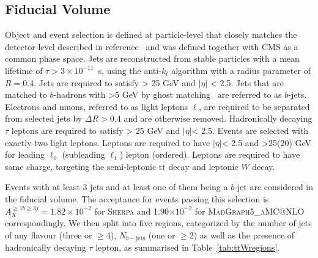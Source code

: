 
\subsection{Fiducial Volume}
\label{sec:ttw_fid}
Object and event selection is defined at particle-level that closely matches the detector-level described in reference~\cite{ATLAS-CONF-2019-045} and was defined together with CMS as a common phase space. 
Jets are reconstructed from stable particles with a mean lifetime of $\tau > 3\times 10^{-11}$~s, using the anti-$k_t$ algorithm with a radius parameter of $R=0.4$.
Jets are required to satisfy \pt > 25 GeV and $|\eta|$ < 2.5.
Jets that are matched to $b$-hadrons with \pt>5 GeV by ghost matching~\cite{Cacciari:2008gn} are referred to as $b$-jets. 
Electrons and muons, referred to as light leptons $\ell$, are required to be separated from selected jets by $\Delta R>0.4$ and are otherwise removed. 
Hadronically decaying $\tau$ leptons are required to satisfy \pt> 25 GeV and $|\eta| $< 2.5.
Events are selected with exactly two light leptons.
Leptons are required to have $|\eta|$< 2.5 and \pt>25(20) GeV for leading $\ell_0$ (subleading $\ell_1$) lepton (\pt ordered). 
Leptons are required to have same charge, targeting the semi-leptonic $\mathrm{t\bar{t}}$ decay and leptonic $W$ decay.

Events with at least 3 jets and at least one of them being a $b$-jet are considered in the fiducial volume. 
The acceptance for events passing this selection is $A_X^{\geq1b\geq3j}=1.82\times10^{-2}$ for \textsc{Sherpa} and 1.90$\times10^{-2}$ for \textsc{MadGraph5\_aMC@NLO} correspondingly.
We then split into five regions, categorized by the number of jets of any flavour (three or  $\geq$4), $N_{b-\mathrm{jets}}$ (one or $\geq$2) as well as the presence of hadronically decaying $\tau$ lepton, as summarised in Table~\ref{tab:ttWregions}.

